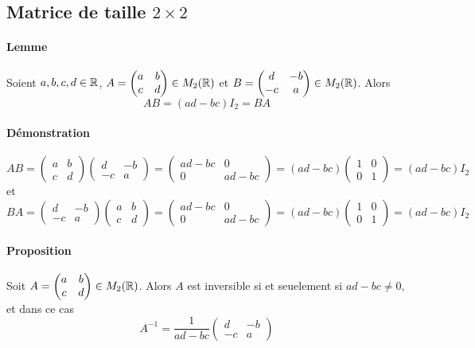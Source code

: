 %
\subsection{Matrice de taille $2\times 2$}
%
\paragraph{Lemme} Soient $a, b, c, d \in \mathbb{R}$, $A = \begin{pmatrix} a & b \\ c & d \end{pmatrix} \in M_{2}(\mathbb{R})$ et $B = \begin{pmatrix} d & -b \\ -c & a \end{pmatrix} \in M_{2}(\mathbb{R})$. Alors 
$$A B = (a d - b c) I_2 = B A$$

\paragraph{Démonstration} 
$$A B 
  = \begin{pmatrix} a & b \\ c & d \end{pmatrix} \begin{pmatrix} d & -b \\ -c & a \end{pmatrix} 
  = \begin{pmatrix} ad-bc & 0 \\ 0 & ad-bc \end{pmatrix} 
  = (ad-bc) \begin{pmatrix} 1 & 0 \\ 0 & 1 \end{pmatrix} 
  = (ad-bc) I_2$$
et 
$$B A 
  = \begin{pmatrix} d & -b \\ -c & a \end{pmatrix} \begin{pmatrix} a & b \\ c & d \end{pmatrix} 
  = \begin{pmatrix} ad-bc & 0 \\ 0 & ad-bc \end{pmatrix} 
  = (ad-bc) \begin{pmatrix} 1 & 0 \\ 0 & 1 \end{pmatrix} 
  = (ad-bc) I_2$$

\paragraph{Proposition} Soit $A = \begin{pmatrix} a & b \\ c & d \end{pmatrix} \in M_{2}(\mathbb{R})$. Alors $A$ est inversible si et seuelement si $a d - b c \neq 0$, et dans ce cas
$$A^{-1} = \frac{1}{a d - b c} \begin{pmatrix} d & -b \\ -c & a \end{pmatrix}$$

